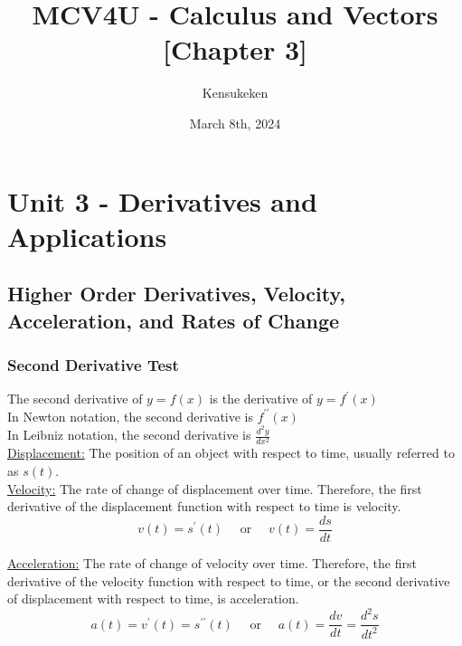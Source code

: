 \documentclass{article}
\title{MCV4U - Calculus and Vectors [Chapter 3]}
\author{Kensukeken}
\date{March 8th, 2024}
\begin{document}
\maketitle

\tableofcontents
\newpage
\section{Unit 3 - Derivatives and Applications}
\subsection{Higher Order Derivatives, Velocity, Acceleration, and Rates of Change}
\subsubsection*{Second Derivative Test}
The second derivative of $y=f(x)$ is the derivative of $y=f^{\prime}(x)$\\
In Newton notation, the second derivative is $f^{\prime \prime}(x)$\\
In Leibniz notation, the second derivative is $\frac{d^2 y}{d x^2}$\\

\underline{Displacement:} The position of an object with respect to time, usually referred to as $s(t)$.\\

\underline{Velocity:} The rate of change of displacement over time. Therefore, the first derivative of the displacement function with respect to time is velocity.\\
$$
v(t)=s^{\prime}(t) \quad \text { or } \quad v(t)=\frac{d s}{d t}
$$

\underline{Acceleration:} The rate of change of velocity over time. Therefore, the first derivative of the velocity function with respect to time, or the second derivative of displacement with respect to time, is acceleration.\\
$$
a(t)=v^{\prime}(t)=s^{\prime \prime}(t) \quad \text { or } \quad a(t)=\frac{d v}{d t}=\frac{d^2 s}{d t^2}
$$
\end{document}
